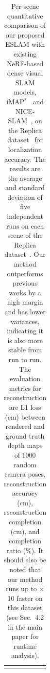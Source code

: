 \begin{table}[t]
\begin{center}
\begin{tabular}{l|l|cccc}
            \Xhline{2\arrayrulewidth}
            \end{tabular}
    \end{center}
    \caption{Per-scene quantitative comparison of our proposed ESLAM with existing NeRF-based dense visual SLAM models, iMAP$^{*}$~\cite{sucar2021imap} and NICE-SLAM~\cite{zhu2022nice}, on the Replica dataset~\cite{replica19arxiv} for localization accuracy. The results are the average and standard deviation of five independent runs on each scene of the Replica dataset~\cite{replica19arxiv}. Our method outperforms previous works by a high margin and has lower variances, indicating it is also more stable from run to run. The evaluation metrics for reconstruction are L1 loss (cm) between rendered and ground truth depth maps of 1000 random camera poses, reconstruction accuracy (cm), reconstruction completion (cm), and completion ratio (\%). It should also be noted that our method runs up to $\times$10 faster on this dataset (see Sec.~4.2 in the main paper for runtime analysis).}
    \label{table:per_scene_reconstruction}
\end{table}

